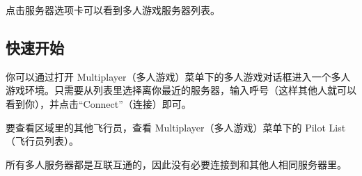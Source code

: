 \noindent
{}

\ifchinese
点击服务器选项卡可以看到多人游戏服务器列表。
\fi
\iffalse
\IfLanguageName{english}{
Click on the `server' tab to see a list of multiplayer servers.
}{}
\fi
{}

\ifchinese
\subsection{快速开始}

你可以通过打开 Multiplayer（多人游戏）菜单下的多人游戏对话框进入一个多人游戏环境。只需要从列表里选择离你最近的服务器，输入呼号（这样其他人就可以看到你），并点击“Connect”（连接）即可。

要查看区域里的其他飞行员，查看 Multiplayer（多人游戏）菜单下的 Pilot List（飞行员列表）。

所有多人服务器都是互联互通的，因此没有必要连接到和其他人相同服务器里。
\fi
\iffalse
\IfLanguageName{english}{
\subsection{Quick Start}

You can connect to the MP environment from the MP Settings dialog under the Multiplayer menu. Simply select the
server closest to you from the list, enter a callsign (which will be seen by other players), and click
''Connect''.

To see a list of other pilots are in the area, select Pilot List from the Multiplayer menu.

All the standard MP servers are interconnected, so there is no need to be on the same server as people you are flying with.
}{}
\fi
{}

